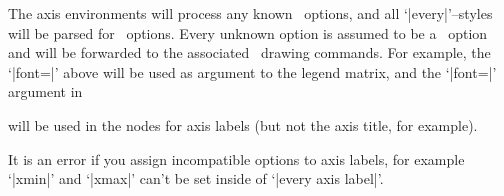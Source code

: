 The axis environments will process any known \PGFPlots\ options, and all `|every|'--styles will be parsed for \PGFPlots\ options. Every unknown option is assumed to be a \Tikz\ option and will be forwarded to the associated \Tikz\ drawing commands. For example, the `|font=\Large|' above will be used as argument to the legend matrix, and the `|font=\Large|' argument in 
\begin{codeexample}
\end{codeexample}
will be used in the nodes for axis labels (but not the axis title, for example).

It is an error if you assign incompatible options to axis labels, for example `|xmin|' and `|xmax|' can't be set inside of `|every axis label|'.
